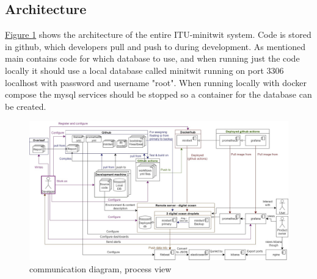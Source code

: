 \subsection{Architecture} %
\hyperref[fig:componentDiagram]{Figure \ref{fig:componentDiagram}} shows the architecture of the entire ITU-minitwit system. Code is stored in github, which developers pull and push to during development. As mentioned main contains code for which database to use, and when running just the code locally it should use a local database called minitwit running on port 3306 localhost with password and username "root". When running locally with docker compose the mysql services should be stopped so a container for the database can be created. 




\begin{figure}[H]
    \centering
    \includegraphics[width=1.0\textwidth]{images/Diagrams-Process_view_communication_diagram.jpg}
    \caption{communication diagram, process view}
    \label{fig:componentDiagram}
\end{figure}





